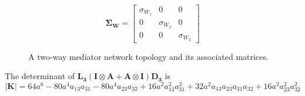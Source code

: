 \documentclass{article}
\begin{document}
\begin{figure}[H]
\begin{minipage}[c]{0.25\textwidth}
\end{minipage}%
\hspace{0.005\textwidth}%
\begin{minipage}[c]{0.27\textwidth}
\raggedright

\[
\mathbf{\Sigma_W}=
\begin{bmatrix}
\sigma_{W_1} & 0 & 0 \\
0 & \sigma_{W_2} & 0 \\
0 & 0 & \sigma_{W_3}
\end{bmatrix}
\]

\end{minipage}%

\caption{A two-way mediator network topology and its associated matrices.}
\label{fig:network_mediator2way}
\end{figure}

The determinant of $\mathbf{L_3}(\mathbf{I} \otimes \mathbf{A} + \mathbf{A} \otimes \mathbf{I}) \mathbf{D_3}$ is
\begin{equation}
|\mathbf{K}| = 64a^6-80a^4a_{13}a_{31}-80a^4a_{23}a_{32}+16a^2a_{13}^2a_{31}^2+32a^2a_{13}a_{23}a_{31}a_{32}+16a^2a_{23}^2a_{32}^2
\end{equation}
\end{document}
